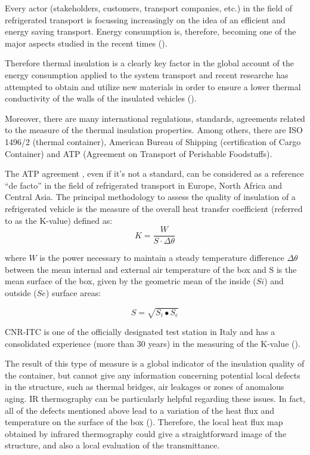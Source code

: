 \documentclass{tQRT2e}
\begin{document}
Every actor (stakeholders, customers, transport companies, etc.) in the field of refrigerated transport is focussing increasingly on the idea of an efficient and energy saving transport. Energy consumption is, therefore, becoming one of the major aspects studied in the recent times (\cite{Tassou2009,Cavalier2010,Adekomaya2017}). 

Therefore thermal insulation is a clearly key factor in the global account of the energy consumption applied to the system transport and recent researche has attempted to obtain and utilize new materials in order to ensure a lower thermal conductivity of the walls of the insulated vehicles (\cite{Tinti2014,Lawton2016}).

Moreover, there are many international regulations, standards, agreements related to the measure of the thermal insulation properties. Among others, there are ISO 1496/2 (thermal container), American Bureau of Shipping (certification of Cargo Container) and ATP (Agreement on Transport of Perishable Foodstuffs).

The ATP agreement \cite{Geneva1970}, even if it’s not a standard, can be considered as a reference “de facto” in the field of refrigerated transport in Europe, North Africa and Central Asia. The principal methodology to assess the quality of insulation of a refrigerated vehicle is the measure of the overall heat transfer coefficient (referred to as the K-value) defined as:
\begin{equation}
K=\frac{W}{S⋅\Delta \theta}
\end{equation}


where $ W $ is the power necessary to maintain a steady temperature difference $ \Delta \theta $ between the mean internal and external air temperature of the box and S is the mean surface of the box, given by the geometric mean of the inside ($ Si $) and outside ($ Se $) surface areas:

\begin{equation}
S=\sqrt{S_i∙S_e}
\end{equation}

CNR-ITC is one of the officially designated test station in Italy and has a consolidated experience (more than 30 years) in the measuring of the K-value (\cite{rossi2009k}).

The result of this type of measure is a global indicator of the insulation quality of the container, but cannot give any information concerning potential local defects in the structure, such as thermal bridges, air leakages or zones of anomalous aging. IR thermography can be particularly helpful regarding these issues. In fact, all of the defects mentioned above lead to a variation of the heat flux and temperature on the surface of the box (\cite{grinzato2010r, grinzatoquality, grinzato1comparison}). Therefore, the local heat flux map obtained by infrared thermography could give a straightforward image of the structure, and also a local evaluation of the transmittance.
\end{document}
